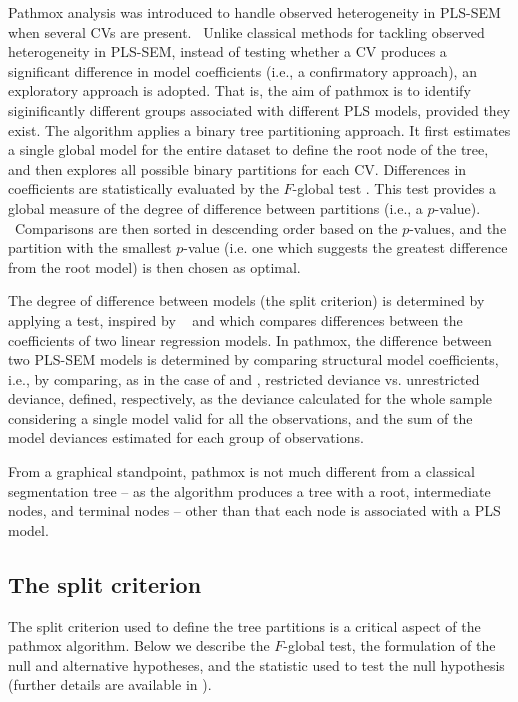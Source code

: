 Pathmox analysis  \citep{Lamberti16, Lamberti17} was introduced to handle observed heterogeneity in PLS-SEM when several CVs are present.  Unlike classical methods for tackling observed heterogeneity in PLS-SEM, instead of testing whether a CV produces a significant difference in model coefficients (i.e., a confirmatory approach),  an exploratory approach is adopted. That is, the aim of pathmox is to identify siginificantly different groups associated with different PLS models, provided they exist. The algorithm applies a binary tree partitioning approach. It first estimates a single global model for the entire dataset to define the root node of the tree, and then explores all possible binary partitions for each CV. Differences in coefficients are statistically evaluated by the $F$-global test  \citep{Lamberti16}. This test provides a global measure of the degree of difference between partitions (i.e., a $p$-value).  Comparisons are then sorted  in descending order based on the $p$-values, and the partition with the smallest $p$-value (i.e. one which suggests the greatest difference from the root model) is then chosen as optimal. 

The degree of difference between models (the split criterion) is determined by applying a test, inspired by  \citet{Chow60} and \citet{Lebart79} which compares differences between the coefficients of two linear regression models. In pathmox, the difference between two PLS-SEM models is determined by comparing structural model coefficients, i.e., by comparing, as in the case of \citet{Chow60} and \citet{Lebart79}, restricted deviance vs. unrestricted deviance, defined, respectively, as the deviance calculated for the whole sample considering a single model valid for all the observations, and the sum of the model deviances estimated for each group of observations.  

From a graphical standpoint, pathmox is not much different from a classical segmentation tree -- as the algorithm produces a tree with a root, intermediate nodes, and terminal nodes -- other than that each node is associated with a PLS model. 

\subsection{The split criterion}

The split criterion used to define the tree partitions is a critical aspect of the pathmox algorithm. Below we describe the $F$-global test, the formulation of the null and alternative hypotheses, and the statistic used to test the null hypothesis (further details are available in \citealp{Lamberti16}).

